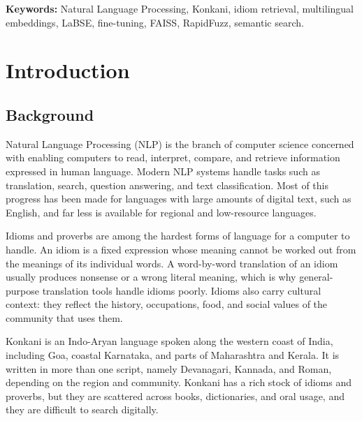 \documentclass[12pt,a4paper]{article}
\let\oldsection\section
\renewcommand{\section}{\clearpage\oldsection}
\begin{document}
\vspace{0.5cm}
\noindent\textbf{Keywords:} Natural Language Processing, Konkani, idiom retrieval, multilingual embeddings, LaBSE, fine-tuning, FAISS, RapidFuzz, semantic search.
\newpage

\tableofcontents
\newpage

\listoffigures


\listoftables
\newpage


\section{Introduction}

\subsection{Background}
Natural Language Processing (NLP) is the branch of computer science concerned with enabling computers to read, interpret, compare, and retrieve information expressed in human language. Modern NLP systems handle tasks such as translation, search, question answering, and text classification. Most of this progress has been made for languages with large amounts of digital text, such as English, and far less is available for regional and low-resource languages.

Idioms and proverbs are among the hardest forms of language for a computer to handle. An idiom is a fixed expression whose meaning cannot be worked out from the meanings of its individual words. A word-by-word translation of an idiom usually produces nonsense or a wrong literal meaning, which is why general-purpose translation tools handle idioms poorly. Idioms also carry cultural context: they reflect the history, occupations, food, and social values of the community that uses them.

Konkani is an Indo-Aryan language spoken along the western coast of India, including Goa, coastal Karnataka, and parts of Maharashtra and Kerala. It is written in more than one script, namely Devanagari, Kannada, and Roman, depending on the region and community. Konkani has a rich stock of idioms and proverbs, but they are scattered across books, dictionaries, and oral usage, and they are difficult to search digitally.
\end{document}
